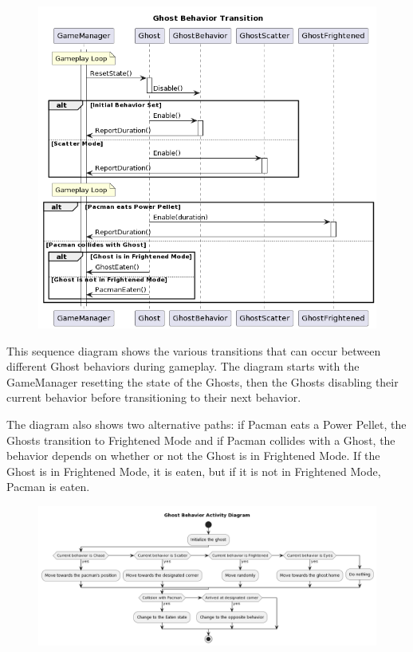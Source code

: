 \documentclass[11pt]{article}
\begin{document}
\begin{figure}[H]
    \centering
    \includegraphics*[scale=0.4]{Ghost_Sequence.png}
\end{figure}

This sequence diagram shows the various transitions that can occur between different Ghost behaviors during gameplay. The diagram starts with the GameManager resetting the state of the Ghosts, then the Ghosts disabling their current behavior before transitioning to their next behavior.

The diagram also shows two alternative paths: if Pacman eats a Power Pellet, the Ghosts transition to Frightened Mode and if Pacman collides with a Ghost, the behavior depends on whether or not the Ghost is in Frightened Mode. If the Ghost is in Frightened Mode, it is eaten, but if it is not in Frightened Mode, Pacman is eaten.

\begin{figure}[H]
    \centering
    \includegraphics*[scale=0.4]{Ghost_Activity.png}
\end{figure}
\end{document}
